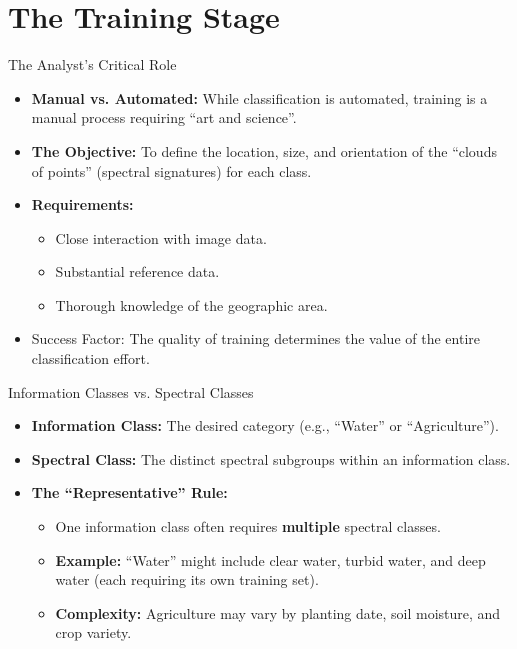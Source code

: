 \documentclass[aspectratio=169]{beamer}
\begin{document}
\section{The Training Stage}

\begin{frame}{The Analyst's Critical Role}
    \begin{itemize}
        \item \textbf{Manual vs. Automated:} While classification is automated, training is a manual process requiring ``art and science''.
        \item \textbf{The Objective:} To define the location, size, and orientation of the ``clouds of points'' (spectral signatures) for each class.
        \item \textbf{Requirements:}
        \begin{itemize}
            \item Close interaction with image data.
            \item Substantial reference data.
            \item Thorough knowledge of the geographic area.
        \end{itemize}
        \item \alert{Success Factor:} The quality of training determines the value of the entire classification effort.
    \end{itemize}
\end{frame}

\begin{frame}{Information Classes vs. Spectral Classes}
    \begin{itemize}
        \item \textbf{Information Class:} The desired category (e.g., ``Water'' or ``Agriculture'').
        \item \textbf{Spectral Class:} The distinct spectral subgroups within an information class.
        \item \textbf{The ``Representative'' Rule:}
        \begin{itemize}
            \item One information class often requires \textbf{multiple} spectral classes.
            \item \textbf{Example:} ``Water'' might include clear water, turbid water, and deep water (each requiring its own training set).
            \item \textbf{Complexity:} Agriculture may vary by planting date, soil moisture, and crop variety.
        \end{itemize}
    \end{itemize}
\end{frame}
\end{document}
